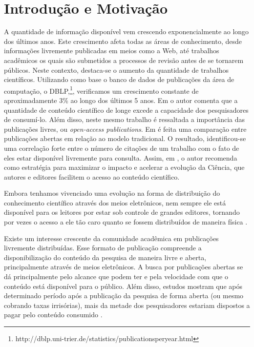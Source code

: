 \chapter{Introdução e Motivação}
A quantidade de informação disponível vem crescendo exponencialmente ao longo dos últimos anos. Este crescimento afeta todas as áreas de conhecimento, desde informações livremente publicadas em meios como a Web, até trabalhos acadêmicos os quais são submetidos a processos de revisão antes de se tornarem públicos. Neste contexto, destaca-se o aumento da quantidade de trabalhos científicos. Utilizando como base o banco de dados de publicações da área de computação, o DBLP,\footnote{http://dblp.uni-trier.de/statistics/publicationsperyear.html}, verificamos um crescimento constante de aproximadamente 3\% ao longo dos últimos 5 anos. Em \cite{Online2001} o autor comenta que a quantidade de conteúdo científico de longe excede a capacidade dos pesquisadores de consumí-lo. Além disso, neste mesmo trabalho é ressaltada a importância das publicações livres, ou \textit{open-access publications}. Em \cite{Comparing2004} é feita uma comparação entre publicações abertas em relação ao modelo tradicional. O resultado, identificou-se uma correlação forte entre o número de citações de um trabalho com o fato de eles estar disponível livremente para consulta. Assim, em \cite{Online2001}, o autor recomenda como estratégia para maximizar o impacto e acelerar a evolução da Ciência, que autores e editores facilitem o acesso ao conteúdo científico.

Embora tenhamos vivenciado uma evolução na forma de distribuição do conhecimento científico através dos meios eletrônicos, nem sempre ele está disponível para os leitores por estar sob controle de grandes editores, tornando por vezes o acesso a ele tão caro quanto se fossem distribuídos de maneira física \cite{OpenAccessAnalysis2004}.

Existe um interesse crescente da comunidade acadêmica em publicações livremente distribuídas. Esse formato de publicação compreende a disponibilização do conteúdo da pesquisa de maneira livre e aberta, principalmente através de meios eletrônicos. A busca por publicações abertas se dá principalmente pelo alcance que podem ter e pela velocidade com que o conteúdo está disponível para o público. Além disso, estudos mostram que após determinado período após a publicação da pesquisa de forma aberta (ou mesmo cobrando taxas irrisórias), mais da metade dos pesquisadores estariam dispostos a pagar pelo conteúdo consumido \cite{Societies2002Misc}.

